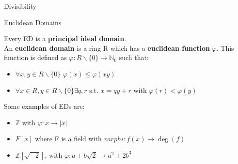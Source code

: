\documentclass[12pt, letterpaper]{article}
\begin{document}
\begin{section}{Divisibility}

  \begin{subsection}{Euclidean Domains}

    Every ED is a \textbf{principal ideal domain}. \\
    An \textbf{euclidean domain} is a ring R which has a
    \textbf{euclidean function} \(\varphi\). This function is defined
    as \(\varphi: R \backslash{} \{0\} \to \mathbb{N}_{0}\) such that:
    \begin{itemize}
      \item \(\forall x, y \in R \backslash{} \{0\}\) \(\varphi(x) \leq \varphi(xy)\)
      \item \(\forall x \in R, y \in R \backslash{} \{0\} \exists q, r\) s.t.
            \(x = qy + r\) with \(\varphi(r) < \varphi(y)\)
    \end{itemize}

    Some examples of EDs are:
    \begin{itemize}
      \item \(\mathbb{Z}\) with \(\varphi: x \to |x|\)
      \item \(F[x]\) where F is a field with \(varphi: f(x) \to \deg(f)\)
      \item \(\mathbb{Z}[\sqrt{-2}]\), with \(\varphi: a + b\sqrt{2}
            \to a^{2} + 2b^{3}\)
    \end{itemize}

  \end{subsection}

\end{section}
\end{document}

